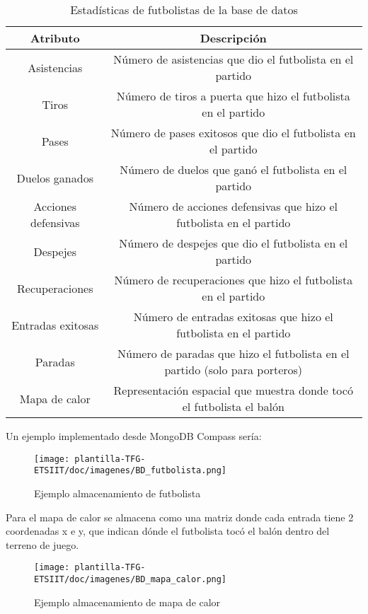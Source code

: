 \begin{table}[H]
    \centering
    \begin{tabular}{|c|c|}
        \hline
        \textbf{Atributo} & \textbf{Descripción} \\
        \hline
        Asistencias & Número de asistencias que dio el futbolista en el partido \\
        \hline
        Tiros & Número de tiros a puerta que hizo el futbolista en el partido \\
        \hline
        Pases & Número de pases exitosos que dio el futbolista en el partido \\
        \hline
        Duelos ganados & Número de duelos que ganó el futbolista en el partido \\
        \hline
        Acciones defensivas & Número de acciones defensivas que hizo el futbolista en el partido \\
        \hline
        Despejes & Número de despejes que dio el futbolista en el partido \\
        \hline
        Recuperaciones & Número de recuperaciones que hizo el futbolista en el partido \\
        \hline
        Entradas exitosas & Número de entradas exitosas que hizo el futbolista en el partido \\
        \hline
        Paradas & Número de paradas que hizo el futbolista en el partido (solo para porteros)\\
        \hline
        Mapa de calor & Representación espacial que muestra donde tocó el futbolista el balón \\
        \hline
    \end{tabular}
    \caption{Estadísticas de futbolistas de la base de datos}
    \label{tab:ejemplo}
\end{table}

Un ejemplo implementado desde MongoDB Compass sería:
\begin{figure}[H]
    \centering
    \texttt{[image: plantilla-TFG-ETSIIT/doc/imagenes/BD\_futbolista.png]}
    \caption{Ejemplo almacenamiento de futbolista}
    \label{fig:etiqueta-imagen}
\end{figure}

Para el mapa de calor se almacena como una matriz donde cada entrada tiene 2 coordenadas x e y,  que indican dónde el futbolista tocó el balón dentro del terreno de juego.

\begin{figure}[H]
    \centering
    \texttt{[image: plantilla-TFG-ETSIIT/doc/imagenes/BD\_mapa\_calor.png]}
    \caption{Ejemplo almacenamiento de mapa de calor}
    \label{fig:etiqueta-imagen}
\end{figure}

